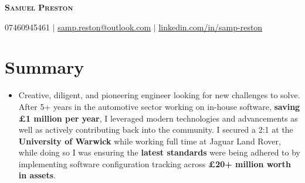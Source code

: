 \documentclass[letterpaper,11pt]{article}
\newcommand{\resumeItem}[1]{
  \item\small{
    {#1 \vspace{-2pt}}
  }
}
\newcommand{\resumeSubHeadingListStart}{\begin{itemize}[leftmargin=0.15in, label={}]}
\newcommand{\resumeSubHeadingListEnd}{\end{itemize}}
\begin{document}
\begin{center}
    \textbf{\Huge \scshape Samuel Preston}
\end{center}

\begin{center}
\small 07460945461 $|$
\href{mailto:samp.reston@outlook.com}{\underline{samp.reston@outlook.com}} $|$
\href{https://www.linkedin.com/in/samp-reston/}{\underline{linkedin.com/in/samp-reston}} 
\end{center}


\section{Summary}
  \resumeSubHeadingListStart
    \resumeItem{Creative, diligent, and pioneering engineer looking for new challenges to solve. After 5+ years in the automotive sector working on in-house software, \textbf{saving £1 million per year}, I leveraged modern technologies and advancements as well as actively contributing back into the community. I secured a 2:1 at the \textbf{University of Warwick} while working full time at Jaguar Land Rover, while doing so I was ensuring the \textbf{latest standards} were being adhered to by implementing software configuration tracking across \textbf{£20+ million worth in assets}.}
  \resumeSubHeadingListEnd

\end{document}
